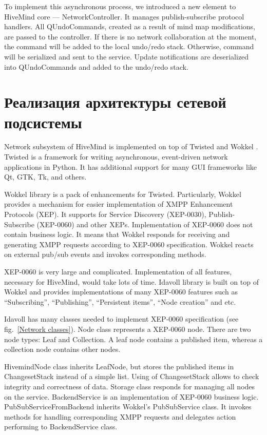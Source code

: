 To implement this asynchronous process, we introduced a new element to HiveMind
core --- NetworkController. It manages publish-subscribe protocol handlers. All
QUndoCommands, created as a result of mind map modifications, are passed to the
controller. If there is no network collaboration at the moment, the command will
be added to the local undo/redo stack. Otherwise, command will be serialized and
sent to the service. Update notifications are deserialized into QUndoCommands
and added to the undo/redo stack.


\section{Реализация архитектуры сетевой подсистемы}

Network subsystem of HiveMind is implemented on top of Twisted \cite{twisted} and
Wokkel \cite{wokkel}. Twisted is a framework for writing asynchronous,
event-driven network applications in Python. It has additional support for many
GUI frameworks like Qt, GTK, Tk, and others.

Wokkel library is a pack of enhancements for Twisted. Particularly, Wokkel
provides a mechanism for easier implementation of XMPP Enhancement Protocols
(XEP). It supports for Service Discovery (XEP-0030), Publish-Subscribe
(XEP-0060) and other XEPs. Implementation of XEP-0060 does not contain business
logic. It means that Wokkel responds for receiving and generating XMPP requests
according to XEP-0060 specification. Wokkel reacts on external pub/sub events
and invokes corresponding methods.

XEP-0060 is very large and complicated. Implementation of all features,
necessary for HiveMind, would take lots of time. Idavoll library is built on top
of Wokkel and provides implementations of many XEP-0060 features such as
``Subscribing'', ``Publishing'', ``Persistent items'', ``Node creation'' and
etc.

Idavoll has many classes needed to implement XEP-0060 specification (see
fig.~\ref{Network classes}). Node class represents a XEP-0060 node. There are
two node types: Leaf and Collection. A leaf node contains a published item,
whereas a collection node contains other nodes.

HivemindNode class inherits LeafNode, but stores the published items in
ChangesetStack instead of a simple list. Using of ChangesetStack allows to check
integrity and correctness of data. Storage class responds for managing all nodes
on the service. BackendService is an implementation of XEP-0060 business logic.
PubSubServiceFromBackend inherits Wokkel's PubSubService class. It invokes
methods for handling corresponding XMPP requests and delegates action performing
to BackendService class.

